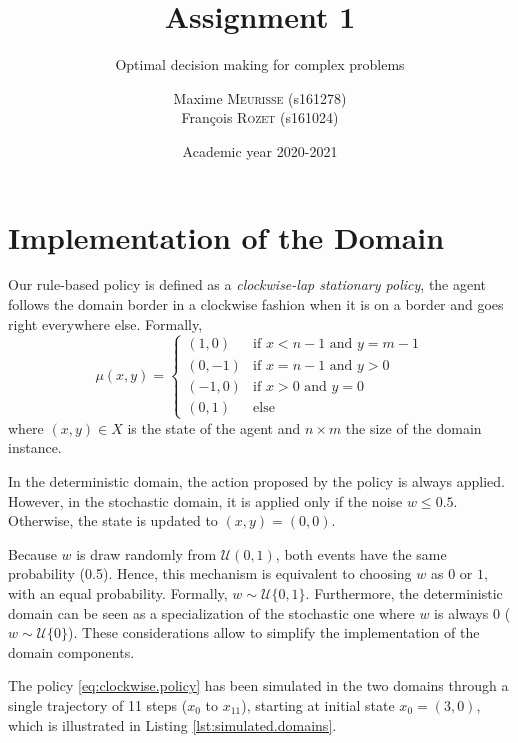 \documentclass[a4paper, 12pt]{article}
\institute{University of Liège}
\title{Assignment 1}
\subtitle{Optimal decision making for complex problems}
\author{%
Maxime \textsc{Meurisse} (s161278)\\%
François \textsc{Rozet} (s161024)%
}
\date{Academic year 2020-2021}
\begin{document}
    \maketitle
    
    \section{Implementation of the Domain}
    
    Our rule-based policy is defined as a \emph{clockwise-lap stationary policy}, \ie{} the agent follows the domain border in a clockwise fashion when it is on a border and goes right everywhere else. Formally,
    \begin{equation}\label{eq:clockwise.policy}
        \mu(x, y) = \begin{cases}
            (1, 0) & \text{if } x < n - 1 \text{ and } y = m - 1 \\
            (0, -1) & \text{if } x = n - 1 \text{ and } y > 0 \\
            (-1, 0) & \text{if } x > 0 \text{ and } y = 0 \\
            (0, 1) & \text{else}
        \end{cases}
    \end{equation}
    where $(x, y) \in X$ is the state of the agent and $n \times m$ the size of the domain instance.
    
    In the deterministic domain, the action proposed by the policy is always applied. However, in the stochastic domain, it is applied only if the noise $w \leq 0.5$. Otherwise, the state is updated to $(x, y) = (0, 0)$.
    
    Because $w$ is draw randomly from $\mathcal{U}(0, 1)$, both events have the same probability (\num{0.5}). Hence, this mechanism is equivalent to choosing $w$ as $0$ or $1$, with an equal probability. Formally, $w \sim \mathcal{U}\{0, 1\}$. Furthermore, the deterministic domain can be seen as a specialization of the stochastic one where $w$ is always $0$ ($w \sim \mathcal{U}\{0\}$). These considerations allow to simplify the implementation of the domain components.
    
    The policy \eqref{eq:clockwise.policy} has been simulated in the two domains through a single trajectory of 11 steps ($x_0$ to $x_{11}$), starting at initial state $x_0 = (3, 0)$, which is illustrated in Listing \ref{lst:simulated.domains}.
    
\end{document}
